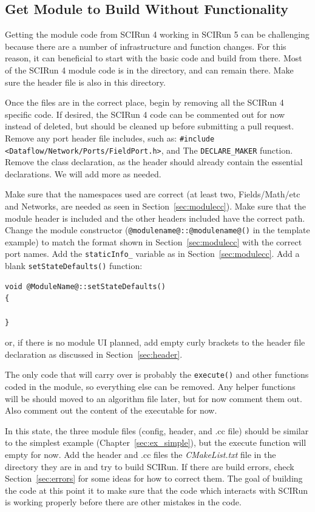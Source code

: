 \documentclass[fleqn,11pt,openany]{book}
\begin{document}
\subsection{Get Module to Build Without Functionality}

Getting the module code from SCIRun 4 working in SCIRun 5 can be challenging because there are a number of infrastructure and function changes.  
For this reason, it can beneficial to start with the basic code and build from there.  
Most of the SCIRun 4 module code is in the  \emph{} directory, and can remain there.  
Make sure the header file is also in this directory.  

Once the files are in the correct place, begin by removing all the SCIRun 4 specific code. 
If desired, the SCIRun 4 code can be commented out for now instead of deleted, but should be cleaned up before submitting a pull request.  
Remove any port header file includes, such as: \verb|#include <Dataflow/Network/Ports/FieldPort.h>|, and The \verb|DECLARE_MAKER| function.
Remove the class declaration, as the header should already contain the essential declarations.
We will add more as needed.  

Make sure that the namespaces used are correct (at least two, Fields/Math/etc and Networks, are needed as seen in Section~\ref{sec:modulecc}).
Make sure that the module header is included and the other headers included have the correct path. 
Change the module constructor (\verb|@modulename@::@modulename@()| in the template example) to match the format shown in Section~\ref{sec:modulecc} with the correct port names.
Add the \verb|staticInfo_| variable as in Section~\ref{sec:modulecc}.
Add a blank \verb|setStateDefaults()| function:
\begin{verbatim}
void @ModuleName@::setStateDefaults()
{
 
}
\end{verbatim}
or, if there is no module UI planned, add empty curly brackets to the header file declaration as discussed in Section~\ref{sec:header}.  

The only code that will carry over is probably the \verb|execute()| and other functions coded in the module, so everything else can be removed. 
Any helper functions will be should moved to an algorithm file later, but for now comment them out.
Also comment out the content of the executable for now.  

In this state, the three module files (config, header, and .cc file) should be similar to the simplest example (Chapter~\ref{sec:ex_simple}), but the execute function will empty for now. 
Add the header and .cc files the \emph{CMakeList.txt} file in the directory they are in and try to build SCIRun.
If there are build errors, check Section~\ref{sec:errors} for some ideas for how to correct them.  
The goal of building the code at this point it to make sure that the code which interacts with SCIRun is working properly before there are other mistakes in the code.
\end{document}
